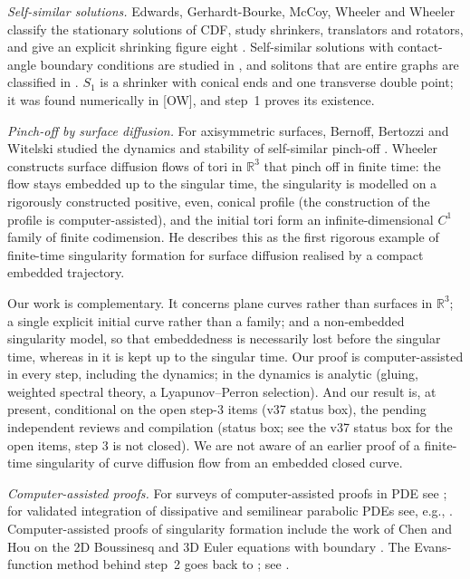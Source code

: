 \documentclass[11pt]{amsart}
\theoremstyle{definition}
\theoremstyle{remark}
\newcommand{\R}{\mathbb{R}}
\newcommand{\dref}[1]{[\textsf{#1}]}
\begin{document}
\emph{Self-similar solutions.} Edwards, Gerhardt-Bourke, McCoy, Wheeler and Wheeler classify the stationary solutions of CDF, study shrinkers, translators and rotators, and give an explicit shrinking figure eight \cite{EGMWW2015}. Self-similar solutions with contact-angle boundary conditions are studied in \cite{AsaiGiga2014}, and solitons that are entire graphs are classified in \cite{RybkaWheeler2024}. $S_1$ is a shrinker with conical ends and one transverse double point; it was found numerically in \dref{OW}, and step~1 proves its existence.

\emph{Pinch-off by surface diffusion.} For axisymmetric surfaces, Bernoff, Bertozzi and Witelski studied the dynamics and stability of self-similar pinch-off \cite{BernoffBertozziWitelski1998}. Wheeler \cite{Wheeler2026} constructs surface diffusion flows of tori in $\R^3$ that pinch off in finite time: the flow stays embedded up to the singular time, the singularity is modelled on a rigorously constructed positive, even, conical profile (the construction of the profile is computer-assisted), and the initial tori form an infinite-dimensional $C^1$ family of finite codimension. He describes this as the first rigorous example of finite-time singularity formation for surface diffusion realised by a compact embedded trajectory.

Our work is complementary. It concerns plane curves rather than surfaces in $\R^3$; a single explicit initial curve rather than a family; and a non-embedded singularity model, so that embeddedness is necessarily lost before the singular time, whereas in \cite{Wheeler2026} it is kept up to the singular time. Our proof is computer-assisted in every step, including the dynamics; in \cite{Wheeler2026} the dynamics is analytic (gluing, weighted spectral theory, a Lyapunov--Perron selection). And our result is, at present, conditional on the open step-3 items (v37 status box), the pending independent reviews and compilation (status box; see the v37 status box for the open items, step 3 is not closed). We are not aware of an earlier proof of a finite-time singularity of curve diffusion flow from an embedded closed curve.

\emph{Computer-assisted proofs.} For surveys of computer-assisted proofs in PDE see \cite{GomezSerrano2019}; for validated integration of dissipative and semilinear parabolic PDEs see, e.g., \cite{Zgliczynski2004,vandenBergBredenSheombarsing2024}. Computer-assisted proofs of singularity formation include the work of Chen and Hou on the 2D Boussinesq and 3D Euler equations with boundary \cite{ChenHou2022,ChenHou2023}. The Evans-function method behind step~2 goes back to \cite{AlexanderGardnerJones1990}; see \cite{KapitulaPromislow2013}.
\end{document}
